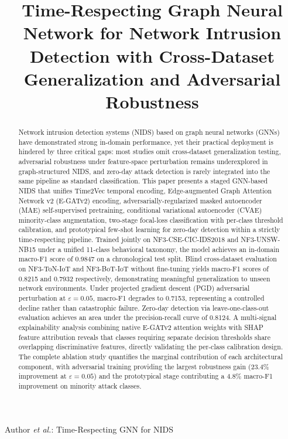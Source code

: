 \documentclass[compsoc,journal]{IEEEtran}
\begin{document}
\title{Time-Respecting Graph Neural Network for Network Intrusion Detection with Cross-Dataset Generalization and Adversarial Robustness}

\author{
}

%
{Author \MakeLowercase{\textit{et al.}}: Time-Respecting GNN for NIDS}

\maketitle

\begin{abstract}
Network intrusion detection systems (NIDS) based on graph neural networks (GNNs) have demonstrated strong in-domain performance, yet their practical deployment is hindered by three critical gaps: most studies omit cross-dataset generalization testing, adversarial robustness under feature-space perturbation remains underexplored in graph-structured NIDS, and zero-day attack detection is rarely integrated into the same pipeline as standard classification. This paper presents a staged GNN-based NIDS that unifies Time2Vec temporal encoding, Edge-augmented Graph Attention Network v2 (E-GATv2) encoding, adversarially-regularized masked autoencoder (MAE) self-supervised pretraining, conditional variational autoencoder (CVAE) minority-class augmentation, two-stage focal-loss classification with per-class threshold calibration, and prototypical few-shot learning for zero-day detection within a strictly time-respecting pipeline. Trained jointly on NF3-CSE-CIC-IDS2018 and NF3-UNSW-NB15 under a unified 11-class behavioral taxonomy, the model achieves an in-domain macro-F1 score of 0.9847 on a chronological test split. Blind cross-dataset evaluation on NF3-ToN-IoT and NF3-BoT-IoT without fine-tuning yields macro-F1 scores of 0.8215 and 0.7932 respectively, demonstrating meaningful generalization to unseen network environments. Under projected gradient descent (PGD) adversarial perturbation at $\varepsilon=0.05$, macro-F1 degrades to 0.7153, representing a controlled decline rather than catastrophic failure. Zero-day detection via leave-one-class-out evaluation achieves an area under the precision-recall curve of 0.8124. A multi-signal explainability analysis combining native E-GATv2 attention weights with SHAP feature attribution reveals that classes requiring separate decision thresholds share overlapping discriminative features, directly validating the per-class calibration design. The complete ablation study quantifies the marginal contribution of each architectural component, with adversarial training providing the largest robustness gain (23.4\% improvement at $\varepsilon=0.05$) and the prototypical stage contributing a 4.8\% macro-F1 improvement on minority attack classes.
\end{abstract}
\end{document}

